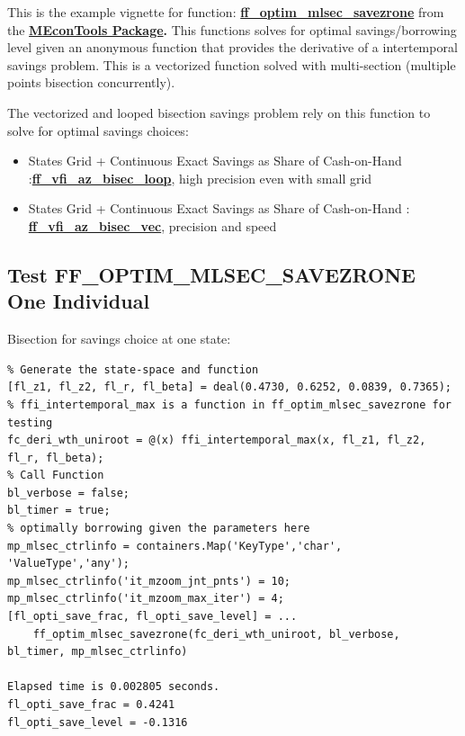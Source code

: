 \documentclass[
]{book}
\begin{document}
This is the example vignette for function:
\href{https://github.com/FanWangEcon//MEconTools/blob/master/MEconTools/optim/ff_optim_mlsec_savezrone.m}{\textbf{ff\_optim\_mlsec\_savezrone}}
from the \href{https://fanwangecon.github.io/MEconTools/}{\textbf{MEconTools
Package}}\textbf{.} This
functions solves for optimal savings/borrowing level given an anonymous
function that provides the derivative of a intertemporal savings
problem. This is a vectorized function solved with multi-section
(multiple points bisection concurrently).

The vectorized and looped bisection savings problem rely on this
function to solve for optimal savings choices:

\begin{itemize}
\item
  States Grid + Continuous Exact Savings as Share of Cash-on-Hand :\href{https://github.com/FanWangEcon/MEconTools/blob/master/MEconTools/vfi/ff_vfi_az_bisec_loop.m}{\textbf{ff\_vfi\_az\_bisec\_loop}},
  high precision even with small grid
\item
  States Grid + Continuous Exact Savings as Share of Cash-on-Hand :
  \href{https://github.com/FanWangEcon/MEconTools/blob/master/MEconTools/vfi/ff_vfi_az_bisec_vec.m}{\textbf{ff\_vfi\_az\_bisec\_vec}},
  precision and speed
\end{itemize}

\hypertarget{test-ff_optim_mlsec_savezrone-one-individual}{%
\subsection{Test FF\_OPTIM\_MLSEC\_SAVEZRONE One Individual}\label{test-ff_optim_mlsec_savezrone-one-individual}}

Bisection for savings choice at one state:

\begin{verbatim}
% Generate the state-space and function
[fl_z1, fl_z2, fl_r, fl_beta] = deal(0.4730, 0.6252, 0.0839, 0.7365);
% ffi_intertemporal_max is a function in ff_optim_mlsec_savezrone for testing
fc_deri_wth_uniroot = @(x) ffi_intertemporal_max(x, fl_z1, fl_z2, fl_r, fl_beta);
% Call Function
bl_verbose = false;
bl_timer = true;
% optimally borrowing given the parameters here
mp_mlsec_ctrlinfo = containers.Map('KeyType','char', 'ValueType','any');
mp_mlsec_ctrlinfo('it_mzoom_jnt_pnts') = 10;
mp_mlsec_ctrlinfo('it_mzoom_max_iter') = 4;
[fl_opti_save_frac, fl_opti_save_level] = ...
    ff_optim_mlsec_savezrone(fc_deri_wth_uniroot, bl_verbose, bl_timer, mp_mlsec_ctrlinfo)

Elapsed time is 0.002805 seconds.
fl_opti_save_frac = 0.4241
fl_opti_save_level = -0.1316
\end{verbatim}
\end{document}
